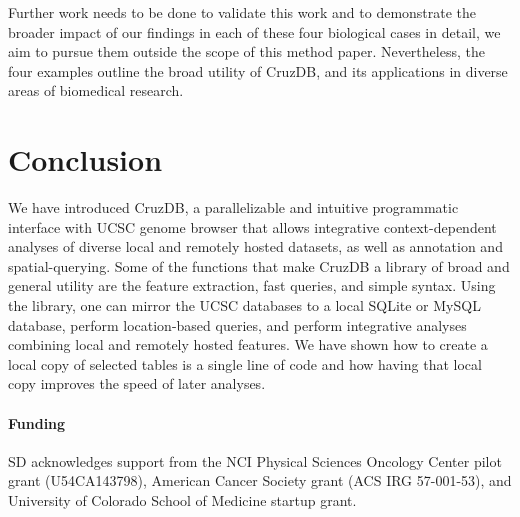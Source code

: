 \documentclass{bioinfo}
\begin{document}
Further work needs to be done to validate this work and to demonstrate the broader impact of our findings in each of these four biological cases in detail, we aim to pursue them outside the scope of this method paper. Nevertheless, the four examples outline the broad utility of CruzDB, and its applications in diverse areas of biomedical research.

%
%



\section{Conclusion}
We have introduced CruzDB, a parallelizable and intuitive programmatic interface with UCSC genome browser that allows integrative context-dependent analyses of diverse local and remotely hosted datasets, as well as annotation and spatial-querying. Some of the functions that make CruzDB a library of broad and general utility are the feature extraction, fast queries, and simple syntax.
Using the library, one can mirror the UCSC databases to a local SQLite or MySQL database, perform location-based queries, and perform integrative analyses combining local and remotely hosted features. We have shown how to create a local copy of selected tables is a single line of code and how having that local copy improves the speed of later analyses.





\paragraph{Funding\textcolon} 
SD acknowledges support from the NCI Physical Sciences Oncology Center pilot grant (U54CA143798), American Cancer Society grant (ACS IRG 57-001-53), and University of Colorado School of Medicine startup grant.

%
%
%
%
%
%
%
% 




  
\end{document}

